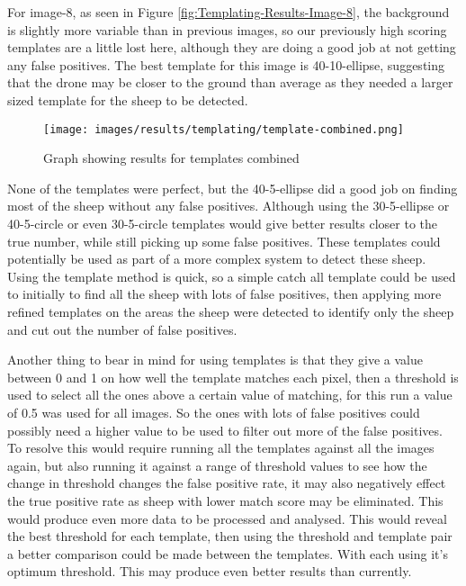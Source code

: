 For image-8, as seen in Figure \ref{fig:Templating-Results-Image-8}, the background is slightly more variable than in previous images, so our previously high scoring templates are a little lost here, although they are doing a good job at not getting any false positives. The best template for this image is 40-10-ellipse, suggesting that the drone may be closer to the ground than average as they needed a larger sized template for the sheep to be detected.  

\begin{figure}[H]
    \centering
    \texttt{[image: images/results/templating/template-combined.png]}
    \caption{Graph showing results for templates combined}
    \label{fig:Templating-Results-combined}
\end{figure}

None of the templates were perfect, but the 40-5-ellipse did a good job on finding most of the sheep without any false positives. Although using the 30-5-ellipse or 40-5-circle or even 30-5-circle templates would give better results closer to the true number, while still picking up some false positives. These templates could potentially be used as part of a more complex system to detect these sheep. Using the template method is quick, so a simple catch all template could be used to initially to find all the sheep with lots of false positives, then applying more refined templates on the areas the sheep were detected to identify only the sheep and cut out the number of false positives. 

Another thing to bear in mind for using templates is that they give a value between 0 and 1 on how well the template matches each pixel, then a threshold is used to select all the ones above a certain value of matching, for this run a value of 0.5 was used for all images. So the ones with lots of false positives could possibly need a higher value to be used to filter out more of the false positives. To resolve this would require running all the templates against all the images again, but also running it against a range of threshold values to see how the change in threshold changes the false positive rate, it may also negatively effect the true positive rate as sheep with lower match score may be eliminated. This would produce even more data to be processed and analysed. This would reveal the best threshold for each template, then using the threshold and template pair a better comparison could be made between the templates. With each using it's optimum threshold. This may produce even better results than currently.

